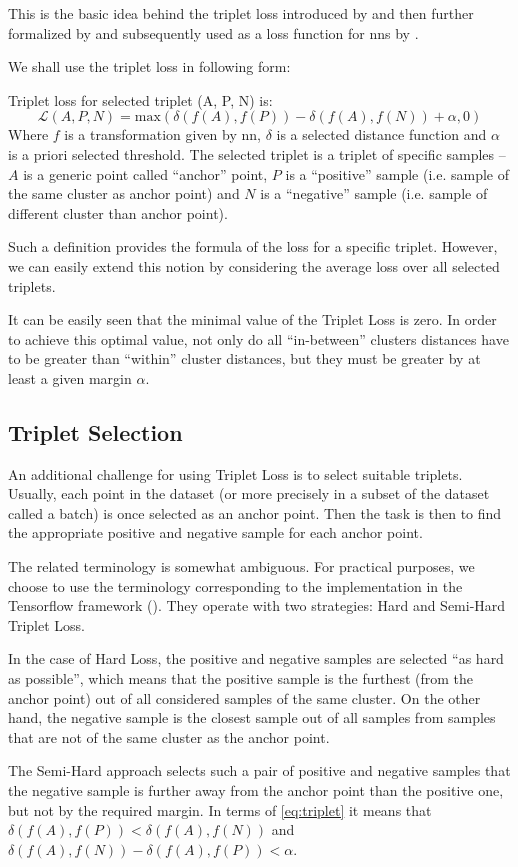 This is the basic idea behind the triplet loss introduced by \cite{tripletlossfirst} and then further formalized by \cite{tripletlosssecond} and subsequently used as a loss function for \glspl{nn} by \cite{tripletlossnn}.

We shall use the triplet loss in following form:
\begin{defn}
Triplet loss for selected triplet (A, P, N) is:
\begin{equation}
\mathcal{L}(A, P, N) = \text{max}(\delta(f(A), f(P)) - \delta(f(A), f(N)) + \alpha, 0)
\label{eq:triplet}
\end{equation}
Where $f$ is a transformation given by \gls{nn}, $\delta$
is a selected distance function and $\alpha$ is a priori selected threshold. The
selected triplet is a triplet of specific samples -- $A$ is a generic point
called ``anchor'' point, $P$ is a ``positive'' sample (i.e. sample of the same
cluster as anchor point) and $N$ is a ``negative'' sample (i.e. sample of
different cluster than anchor point).
\end{defn}


Such a definition provides the formula of the loss for a specific triplet. However, we can easily extend this notion by considering the average loss over all selected triplets.

It can be easily seen that the minimal value of the Triplet Loss is zero. In order to achieve this optimal value, not only do all ``in-between'' clusters distances have to be greater than ``within'' cluster distances, but they must be greater by at least a given margin $\alpha$.

\subsection{Triplet Selection}

An additional challenge for using Triplet Loss is to select suitable triplets. Usually, each point in the dataset (or more precisely in a subset of the dataset called a batch) is once selected as an anchor point. Then the task is then to find the appropriate positive and negative sample for each anchor point.

The related terminology is somewhat ambiguous. For practical purposes, we choose to use the terminology corresponding to the implementation in the Tensorflow framework (\cite{tensorflow}). They operate with two strategies: Hard and Semi-Hard Triplet Loss.

In the case of Hard Loss, the positive and negative samples are selected ``as hard as possible'', which means that the positive sample is the furthest (from the anchor point) out of all considered samples of the same cluster. On the other hand, the negative sample is the closest sample out of all samples from samples that are not of the same cluster as the anchor point.

The Semi-Hard approach selects such a pair of positive and negative samples that the negative sample is further away from the anchor point than the positive one, but not by the required margin. In terms of \autoref{eq:triplet} it means that $\delta(f(A), f(P)) < \delta(f(A), f(N))$ and $\delta(f(A), f(N)) - \delta(f(A), f(P)) < \alpha$.